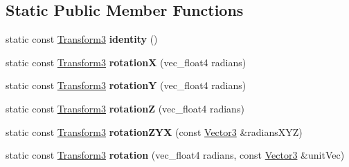 \subsection*{Static Public Member Functions}
\begin{DoxyCompactItemize}
\item 
\hypertarget{classVectormath_1_1Soa_1_1Transform3_ae5bfa13e5996827182711fec67d1cc92}{static const \hyperlink{classVectormath_1_1Soa_1_1Transform3}{Transform3} {\bfseries identity} ()}\label{classVectormath_1_1Soa_1_1Transform3_ae5bfa13e5996827182711fec67d1cc92}

\item 
\hypertarget{classVectormath_1_1Soa_1_1Transform3_acc13308518d4d29959fec572cbdb8e52}{static const \hyperlink{classVectormath_1_1Soa_1_1Transform3}{Transform3} {\bfseries rotation\-X} (vec\-\_\-float4 radians)}\label{classVectormath_1_1Soa_1_1Transform3_acc13308518d4d29959fec572cbdb8e52}

\item 
\hypertarget{classVectormath_1_1Soa_1_1Transform3_afb0ab55059960ca3a97ca74e79b02735}{static const \hyperlink{classVectormath_1_1Soa_1_1Transform3}{Transform3} {\bfseries rotation\-Y} (vec\-\_\-float4 radians)}\label{classVectormath_1_1Soa_1_1Transform3_afb0ab55059960ca3a97ca74e79b02735}

\item 
\hypertarget{classVectormath_1_1Soa_1_1Transform3_ae29a5e52c6db60397cf78a89d928e17d}{static const \hyperlink{classVectormath_1_1Soa_1_1Transform3}{Transform3} {\bfseries rotation\-Z} (vec\-\_\-float4 radians)}\label{classVectormath_1_1Soa_1_1Transform3_ae29a5e52c6db60397cf78a89d928e17d}

\item 
\hypertarget{classVectormath_1_1Soa_1_1Transform3_a8d68d38e34fb9c2a61d62a4b2b1bc564}{static const \hyperlink{classVectormath_1_1Soa_1_1Transform3}{Transform3} {\bfseries rotation\-Z\-Y\-X} (const \hyperlink{classVectormath_1_1Soa_1_1Vector3}{Vector3} \&radians\-X\-Y\-Z)}\label{classVectormath_1_1Soa_1_1Transform3_a8d68d38e34fb9c2a61d62a4b2b1bc564}

\item 
\hypertarget{classVectormath_1_1Soa_1_1Transform3_a3fce7cb94b14898f748118c841170bdb}{static const \hyperlink{classVectormath_1_1Soa_1_1Transform3}{Transform3} {\bfseries rotation} (vec\-\_\-float4 radians, const \hyperlink{classVectormath_1_1Soa_1_1Vector3}{Vector3} \&unit\-Vec)}\label{classVectormath_1_1Soa_1_1Transform3_a3fce7cb94b14898f748118c841170bdb}


\end{DoxyCompactItemize}
